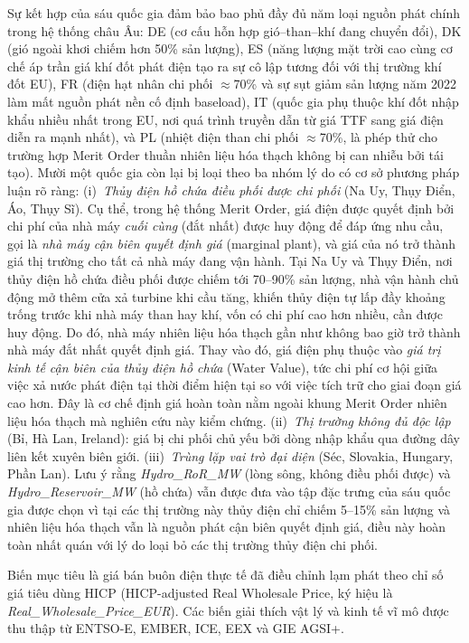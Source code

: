Sự kết hợp của sáu quốc gia đảm bảo bao phủ đầy đủ năm loại nguồn phát chính trong hệ thống châu Âu: DE (cơ cấu hỗn hợp gió--than--khí đang chuyển đổi), DK (gió ngoài khơi chiếm hơn 50\% sản lượng), ES (năng lượng mặt trời cao cùng cơ chế áp trần giá khí đốt phát điện tạo ra sự cô lập tương đối với thị trường khí đốt EU), FR (điện hạt nhân chi phối $\approx$70\% và sự sụt giảm sản lượng năm 2022 làm mất nguồn phát nền cố định baseload), IT (quốc gia phụ thuộc khí đốt nhập khẩu nhiều nhất trong EU, nơi quá trình truyền dẫn từ giá TTF sang giá điện diễn ra mạnh nhất), và PL (nhiệt điện than chi phối $\approx$70\%, là phép thử cho trường hợp Merit Order thuần nhiên liệu hóa thạch không bị can nhiễu bởi tái tạo). Mười một quốc gia còn lại bị loại theo ba nhóm lý do có cơ sở phương pháp luận rõ ràng: (i)~\textit{Thủy điện hồ chứa điều phối được chi phối} (Na Uy, Thụy Điển, Áo, Thụy Sĩ). Cụ thể, trong hệ thống Merit Order, giá điện được quyết định bởi chi phí của nhà máy \textit{cuối cùng} (đắt nhất) được huy động để đáp ứng nhu cầu, gọi là \textit{nhà máy cận biên quyết định giá} (marginal plant), và giá của nó trở thành giá thị trường cho tất cả nhà máy đang vận hành. Tại Na Uy và Thụy Điển, nơi thủy điện hồ chứa điều phối được chiếm tới 70--90\% sản lượng, nhà vận hành chủ động mở thêm cửa xả turbine khi cầu tăng, khiến thủy điện tự lấp đầy khoảng trống trước khi nhà máy than hay khí, vốn có chi phí cao hơn nhiều, cần được huy động. Do đó, nhà máy nhiên liệu hóa thạch gần như không bao giờ trở thành nhà máy đắt nhất quyết định giá. Thay vào đó, giá điện phụ thuộc vào \textit{giá trị kinh tế cận biên của thủy điện hồ chứa} (Water Value), tức chi phí cơ hội giữa việc xả nước phát điện tại thời điểm hiện tại so với việc tích trữ cho giai đoạn giá cao hơn. Đây là cơ chế định giá hoàn toàn nằm ngoài khung Merit Order nhiên liệu hóa thạch mà nghiên cứu này kiểm chứng. (ii)~\textit{Thị trường không đủ độc lập} (Bỉ, Hà Lan, Ireland): giá bị chi phối chủ yếu bởi dòng nhập khẩu qua đường dây liên kết xuyên biên giới. (iii)~\textit{Trùng lặp vai trò đại diện} (Séc, Slovakia, Hungary, Phần Lan). Lưu ý rằng \textit{Hydro\_RoR\_MW} (lòng sông, không điều phối được) và \textit{Hydro\_Reservoir\_MW} (hồ chứa) vẫn được đưa vào tập đặc trưng của sáu quốc gia được chọn vì tại các thị trường này thủy điện chỉ chiếm 5--15\% sản lượng và nhiên liệu hóa thạch vẫn là nguồn phát cận biên quyết định giá, điều này hoàn toàn nhất quán với lý do loại bỏ các thị trường thủy điện chi phối.

Biến mục tiêu là giá bán buôn điện thực tế đã điều chỉnh lạm phát theo chỉ số giá tiêu dùng HICP (HICP-adjusted Real Wholesale Price, ký hiệu là \textit{Real\_Wholesale\_Price\_EUR}). Các biến giải thích vật lý và kinh tế vĩ mô được thu thập từ ENTSO-E, EMBER, ICE, EEX và GIE AGSI+.


